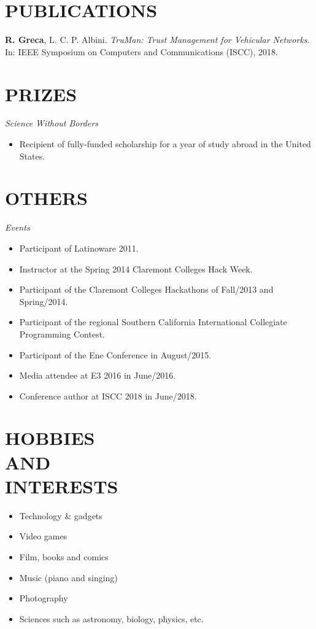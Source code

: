 \documentclass[margin]{res}
\begin{document}
\begin{resume}
		\section{PUBLICATIONS}
			\textbf{R. Greca}, L. C. P. Albini. {\sl TruMan: Trust Management for Vehicular Networks}. In: IEEE Symposium on Computers and Communications (ISCC), 2018.
	
		\section{PRIZES}
			{\sl Science Without Borders}
			\begin{itemize}
				\item[] Recipient of fully-funded scholarship for a year of study abroad in the United States.
			\end{itemize}

		\section{OTHERS}
			{\sl Events}
			\begin{itemize}
				\item[] Participant of Latinoware 2011.
				\item[] Instructor at the Spring 2014 Claremont Colleges Hack Week.
				\item[] Participant of the Claremont Colleges Hackathons of Fall/2013 and Spring/2014.
				\item[] Participant of the regional Southern California International Collegiate Programming Contest.
				\item[] Participant of the Ene Conference in August/2015.
				\item[] Media attendee at E3 2016 in June/2016.
				\item[] Conference author at ISCC 2018 in June/2018.
			\end{itemize}

		\section{HOBBIES \\ AND \\ INTERESTS}
			\begin{itemize}
				\itemsep -2pt
		    	\item Technology \& gadgets
				\item Video games
				\item Film, books and comics
				\item Music (piano and singing)
				\item Photography
				\item Sciences such as astronomy, biology, physics, etc.
			\end{itemize}
	\end{resume}
\end{document}
